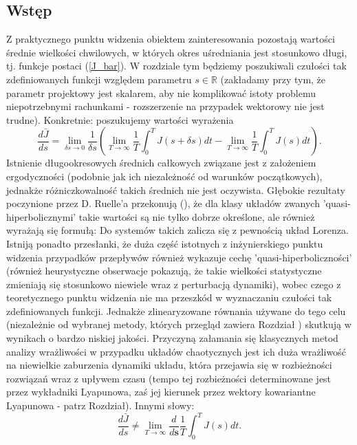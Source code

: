 \documentclass[12pt]{article}
\begin{document}
\subsection{Wstęp}
Z praktycznego punktu widzenia obiektem zainteresowania pozostają wartości średnie wielkości chwilowych, w których okres uśredniania jest stosunkowo długi, tj. funkcje postaci (\ref{J_bar}). W rozdziale tym będziemy poszukiwali czułości tak zdefiniowanych funkcji względem parametru $ s \in \mathbb{R} $ (zakładamy przy tym, że parametr projektowy jest skalarem, aby nie komplikować istoty problemu niepotrzebnymi rachunkami - rozszerzenie na przypadek wektorowy nie jest trudne). Konkretnie: poszukujemy wartości wyrażenia
\begin{equation}
\frac{d\bar{J}}{ds} = \lim\limits_{\delta s \rightarrow 0}\frac{1}{\delta s}(\lim\limits_{T \rightarrow \infty}\frac{1}{T}\int_{0}^{T}J(s + \delta s)dt - \lim\limits_{T \rightarrow \infty}\frac{1}{T}\int_{0}^{T}J(s)dt).
\label{J_derivative}
\end{equation}
Istnienie długookresowych średnich całkowych związane jest z założeniem ergodyczności (podobnie jak ich niezależność od warunków początkowych), jednakże różniczkowalność takich średnich nie jest oczywista. Głębokie rezultaty poczynione przez D. Ruelle'a przekonują (\cite{Ruelle1}), że dla klasy układów zwanych 'quasi-hiperbolicznymi' takie wartości są nie tylko dobrze określone, ale również wyrażają się formułą:
Do systemów takich zalicza się z pewnością układ Lorenza. Istniją ponadto przesłanki, że duża część istotnych z inżynierskiego punktu widzenia przypadków przepływów również wykazuje cechę 'quasi-hiperboliczności' \cite{Qiqi1} (również heurystyczne obserwacje pokazują, że takie wielkości statystyczne zmieniają się stosunkowo niewiele wraz z perturbacją dynamiki), wobec czego z teoretycznego punktu widzenia nie ma przeszkód w wyznaczaniu czułości tak zdefiniowanych funkcji. Jednakże zlinearyzowane równania używane do tego celu (niezależnie od wybranej metody, których przegląd zawiera Rozdział ) skutkują w wynikach o bardzo niskiej jakości. Przyczyną załamania się klasycznych metod analizy wrażliwości w przypadku układów chaotycznych jest ich duża wrażliwość na niewielkie zaburzenia dynamiki układu, która przejawia się w rozbieżności rozwiązań wraz z upływem czasu (tempo tej rozbieżności determinowane jest przez wykładniki Lyapunowa, zaś jej kierunek przez wektory kowariantne Lyapunowa - patrz Rozdział). Innymi słowy: 
\begin{equation}
\frac{d\bar{J}}{ds} 
\neq \lim\limits_{\textit{T}\to\infty}\frac{d}{d\textbf{s}}\frac{1}{T}\int_{0}^{T}J(s)dt.
\label{J_derivative2}
\end{equation}
\end{document}
